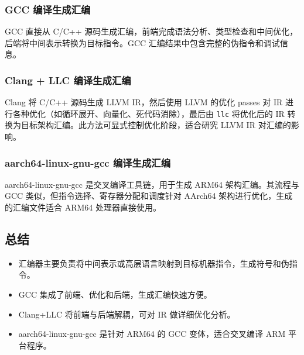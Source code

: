 \documentclass[UTF8,a4paper,10pt]{ctexart}
\begin{document}
\subsubsection{GCC 编译生成汇编}
GCC 直接从 C/C++ 源码生成汇编，前端完成语法分析、类型检查和中间优化，后端将中间表示转换为目标指令。GCC 汇编结果中包含完整的伪指令和调试信息。

\subsubsection{Clang + LLC 编译生成汇编}
Clang 将 C/C++ 源码生成 LLVM IR，然后使用 LLVM 的优化 passes 对 IR 进行各种优化（如循环展开、向量化、死代码消除），最后由 \texttt{llc} 将优化后的 IR 转换为目标架构汇编。此方法可显式控制优化阶段，适合研究 LLVM IR 对汇编的影响。

\subsubsection{aarch64-linux-gnu-gcc 编译生成汇编}
aarch64-linux-gnu-gcc 是交叉编译工具链，用于生成 ARM64 架构汇编。其流程与 GCC 类似，但指令选择、寄存器分配和调度针对 AArch64 架构进行优化，生成的汇编文件适合 ARM64 处理器直接使用。

\subsection{总结}
\begin{itemize}
    \item 汇编器主要负责将中间表示或高层语言映射到目标机器指令，生成符号和伪指令。
    \item GCC 集成了前端、优化和后端，生成汇编快速方便。
    \item Clang+LLC 将前端与后端解耦，可对 IR 做详细优化分析。
    \item aarch64-linux-gnu-gcc 是针对 ARM64 的 GCC 变体，适合交叉编译 ARM 平台程序。
\end{itemize}
\end{document}
